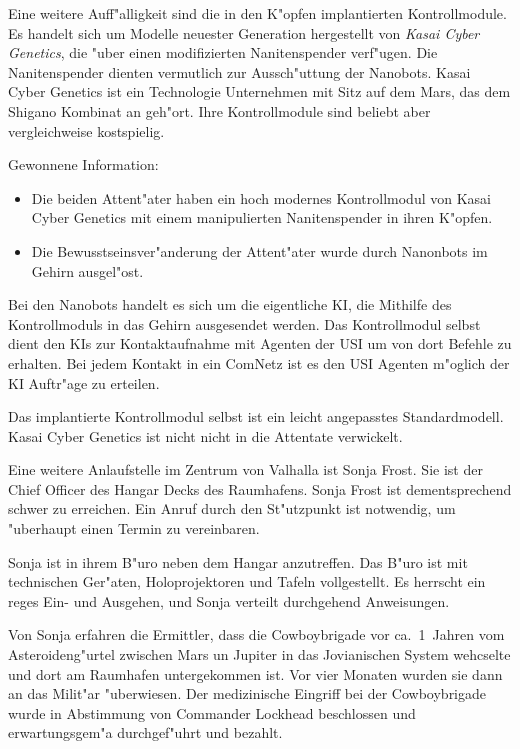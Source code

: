 Eine weitere Auff"alligkeit sind die in den K"opfen implantierten Kontrollmodule. Es handelt sich um Modelle neuester Generation hergestellt von \emph{Kasai Cyber Genetics}, die "uber einen modifizierten Nanitenspender verf"ugen. Die Nanitenspender dienten vermutlich zur Aussch"uttung der Nanobots. Kasai Cyber Genetics ist ein Technologie Unternehmen mit Sitz auf dem Mars, das dem Shigano Kombinat an	geh"ort. Ihre Kontrollmodule sind beliebt aber vergleichweise kostspielig.

\begin{remarks}
	Gewonnene Information: 
	
	\begin{itemize}
		\item Die beiden Attent"ater haben ein hoch modernes Kontrollmodul von Kasai Cyber Genetics mit einem manipulierten Nanitenspender 
			in ihren K"opfen.
		\item Die Bewusstseinsver"anderung der Attent"ater wurde durch Nanonbots im Gehirn ausgel"ost.
	\end{itemize}
	
	Bei den Nanobots handelt es sich um die eigentliche KI, die Mithilfe des Kontrollmoduls in das Gehirn ausgesendet werden. Das Kontrollmodul selbst dient den KIs zur Kontaktaufnahme mit Agenten der USI um von dort Befehle zu erhalten. Bei jedem Kontakt in ein ComNetz ist es den USI Agenten m"oglich der KI Auftr"age zu erteilen.

	Das implantierte Kontrollmodul selbst ist ein leicht angepasstes Standardmodell. Kasai Cyber Genetics ist nicht nicht in die Attentate verwickelt.
\end{remarks}


Eine weitere Anlaufstelle im Zentrum von Valhalla ist Sonja Frost. Sie ist der Chief Officer des Hangar Decks des Raumhafens. Sonja Frost ist dementsprechend schwer zu erreichen. Ein Anruf durch den St"utzpunkt ist notwendig, um "uberhaupt einen Termin zu vereinbaren. 

Sonja ist in ihrem B"uro neben dem Hangar anzutreffen. Das B"uro ist mit technischen Ger"aten, Holoprojektoren und Tafeln vollgestellt. Es herrscht ein reges Ein- und Ausgehen, und Sonja verteilt durchgehend Anweisungen.

Von Sonja erfahren die Ermittler, dass die Cowboybrigade vor ca.~1\half~Jahren vom Asteroideng"urtel zwischen Mars un Jupiter in das Jovianischen System wehcselte und dort am Raumhafen untergekommen ist. Vor vier Monaten wurden sie dann an das Milit"ar "uberwiesen. Der medizinische Eingriff bei der Cowboybrigade wurde in Abstimmung von Commander Lockhead beschlossen und erwartungsgem"a\3 durchgef"uhrt und bezahlt. 


